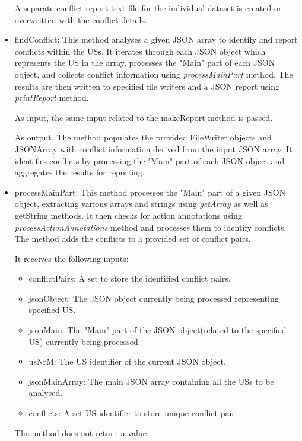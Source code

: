 \begin{itemize}
	A separate conflict report text file for the individual dataset is created or overwritten with the conflict details.
	
	\item findConflict: This method analyses a given JSON array to identify and report conflicts within the USs. It iterates through each JSON object which represents the US in the array, processes the "Main" part of each JSON object, and collects conflict information using \textit{processMainPart} method. The results are then written to specified file writers and a JSON report using \textit{printReport} method.
	
	As input, the same input related to the makeReport method is passed.
	
	As output, The method populates the provided FileWriter objects and JSONArray with conflict information derived from the input JSON array. It identifies conflicts by processing the "Main" part of each JSON object and aggregates the results for reporting.
	
	\item processMainPart: This method processes the "Main" part of a given JSON object, extracting various arrays and strings using \textit{getArray} as well as getString methods. It then checks for action annotations using \textit{processActionAnnotations} method and processes them to identify conflicts. The method adds the conflicts to a provided set of conflict pairs.
	
	It receives the following inputs:
	\begin{itemize}
		\item conflictPairs: A set to store the identified conflict pairs.
		
		\item jsonObject: The JSON object currently being processed representing specified US.
		
		\item jsonMain: The "Main" part of the JSON object(related to the specified US) currently being processed.
		
		\item usNrM: The US identifier of the current JSON object.
		
		\item jsonMainArray: The main JSON array containing all the USs to be analysed.
		
		\item conflicts: A set US identifier to store unique conflict pair.
				
	\end{itemize}	
	The method does not return a value.
	

\end{itemize}
